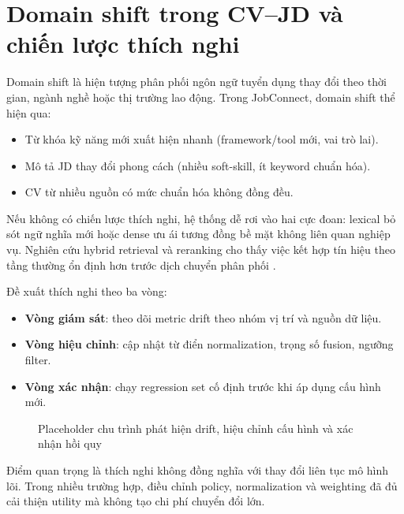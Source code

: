 \section{Domain shift trong CV--JD và chiến lược thích nghi}

Domain shift là hiện tượng phân phối ngôn ngữ tuyển dụng thay đổi theo thời gian, ngành nghề hoặc thị trường lao động. Trong JobConnect, domain shift thể hiện qua:

\begin{itemize}
  \item Từ khóa kỹ năng mới xuất hiện nhanh (framework/tool mới, vai trò lai).
  \item Mô tả JD thay đổi phong cách (nhiều soft-skill, ít keyword chuẩn hóa).
  \item CV từ nhiều nguồn có mức chuẩn hóa không đồng đều.
\end{itemize}

Nếu không có chiến lược thích nghi, hệ thống dễ rơi vào hai cực đoan: lexical bỏ sót ngữ nghĩa mới hoặc dense ưu ái tương đồng bề mặt không liên quan nghiệp vụ. Nghiên cứu hybrid retrieval và reranking cho thấy việc kết hợp tín hiệu theo tầng thường ổn định hơn trước dịch chuyển phân phối \cite{splade,colbertv2,hyrr,lambdamart}.

Đề xuất thích nghi theo ba vòng:
\begin{itemize}
  \item \textbf{Vòng giám sát}: theo dõi metric drift theo nhóm vị trí và nguồn dữ liệu.
  \item \textbf{Vòng hiệu chỉnh}: cập nhật từ điển normalization, trọng số fusion, ngưỡng filter.
  \item \textbf{Vòng xác nhận}: chạy regression set cố định trước khi áp dụng cấu hình mới.
\end{itemize}

\begin{figure}[H]
\centering
{}
\caption{Placeholder chu trình phát hiện drift, hiệu chỉnh cấu hình và xác nhận hồi quy}
\label{fig:domain-shift-adaptation-placeholder}
\end{figure}

Điểm quan trọng là thích nghi không đồng nghĩa với thay đổi liên tục mô hình lõi. Trong nhiều trường hợp, điều chỉnh policy, normalization và weighting đã đủ cải thiện utility mà không tạo chi phí chuyển đổi lớn.

